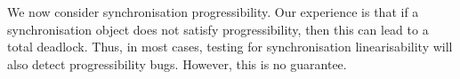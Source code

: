 We now consider synchronisation progressibility.  Our experience is that if a
synchronisation object does not satisfy progressibility, then this can lead to
a total deadlock.  Thus, in most cases, testing for synchronisation
linearisability will also detect progressibility bugs.  However, this is no
guarantee.    


